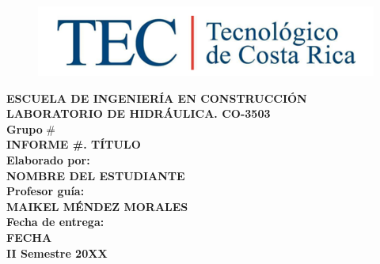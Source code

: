 \documentclass[11pt, letterpaper]{article}
\begin{document}
\begin{titlepage}

\begin{center}

\begin{figure}[H]
	\centering
	\includegraphics[width=1\columnwidth]{LOGO_TEC.png}
\end{figure}

\textbf{\large{ESCUELA DE INGENIERÍA EN CONSTRUCCIÓN}}\\ 
\textbf{\large{LABORATORIO DE HIDRÁULICA. CO-3503}}\\
\textbf{\large{Grupo}} \# \\
\vspace{1in} %
\textbf{\large{INFORME \#. TÍTULO}}\\
\vspace{1in} %
\textbf{\large{Elaborado por:}}\\
\textbf{\large{NOMBRE DEL ESTUDIANTE}}\\
\vspace{0.5in} %
\textbf{\large{Profesor guía:}}\\
\textbf{\large{MAIKEL MÉNDEZ MORALES}}\\
\vspace{0.5in} %
\textbf{\large{Fecha de entrega:}}\\
\textbf{\large{FECHA}}\\
\vspace{1in} %
\textbf{\large{II Semestre 20XX}}\\

\end{center}

\end{titlepage}

\tableofcontents
\end{document}
